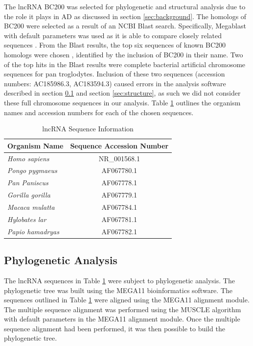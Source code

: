 \documentclass[conference, 11pt]{IEEEtran}
\begin{document}
The lncRNA BC200 was selected for phylogenetic and structural analysis due to the role it plays in AD as discussed in section \ref{sec:background}. 
The homologs of BC200 were selected as a result of an NCBI Blast \cite{blastTool} search. 
Specifically, Megablast \cite{morgulis2008database} with default parameters was used as it is able to compare closely related sequences \cite{amirmahani2018phylogenetic}. 
From the Blast results, the top six sequences of known BC200 homologs were chosen , identified by the inclusion of BC200 in their name. 
Two of the top hits in the Blast results were complete bacterial artificial chromosome sequences for pan troglodytes. 
Inclusion of these two sequences (accession numbers: AC185986.3, AC183594.3) caused errors in the analysis software described in section \ref{sec:phylo} and section \ref{sec:structure}, as such we did not consider these full chromosome sequences in our analysis. 
Table \ref{tbl:accession} outlines the organism names and accession numbers for each of the chosen sequences. 

\begin{table}[ht]
  \centering
  \caption{lncRNA Sequence Information}
  \label{tbl:accession}
  \begin{tabular}{lc}
    \toprule
    Organism Name & Sequence Accession Number \\
    \midrule
    \emph{Homo sapiens}    & NR\_001568.1 \\
    \emph{Pongo pygmaeus}  & AF067780.1 \\
    \emph{Pan Paniscus}    & AF067778.1 \\
    \emph{Gorilla gorilla} & AF067779.1 \\
    \emph{Macaca mulatta}  & AF067784.1 \\
    \emph{Hylobates lar}   & AF067781.1 \\
    \emph{Papio hamadryas} & AF067782.1 \\
    \bottomrule
  \end{tabular}
\end{table}

\subsection{Phylogenetic Analysis}\label{sec:phylo}

The lncRNA sequences in Table \ref{tbl:accession} were subject to phylogenetic analysis.
The phylogenetic tree was built using the MEGA11 \cite{tamura2021mega11} bioinformatics software. 
The sequences outlined in Table \ref{tbl:accession} were aligned using the MEGA11 alignment module. 
The multiple sequence alignment was performed using the MUSCLE algorithm \cite{edgar2004muscle} with default parameters in the MEGA11 alignment module. 
Once the multiple sequence alignment had been performed, it was then possible to build the phylogenetic tree. 
\end{document}
